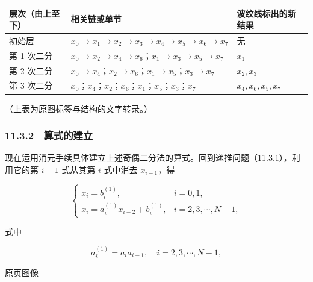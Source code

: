 \documentclass[
  10pt,
  fontset=fandol]{ctexart}
\newcounter{none} %
\begin{document}
{\def\LTcaptype{none} %
\begin{longtable}[]{@{}
  >{\raggedright\arraybackslash}p{}
  >{\raggedright\arraybackslash}p{}
  >{\raggedright\arraybackslash}p{}@{}}
\toprule\noalign{}
\begin{minipage}[b]{\linewidth}\raggedright
层次（由上至下）
\end{minipage} & \begin{minipage}[b]{\linewidth}\raggedright
相关链或单节
\end{minipage} & \begin{minipage}[b]{\linewidth}\raggedright
波纹线标出的新结果
\end{minipage} \\
\midrule\noalign{}
\endhead
\bottomrule\noalign{}
\endlastfoot
初始层 & \(x_0\to x_1\to x_2\to x_3\to x_4\to x_5\to x_6\to x_7\) & 无 \\
第 1 次二分 & \(x_0\to x_2\to x_4\to x_6\)；\(x_1\to x_3\to x_5\to x_7\) & \(x_1\) \\
第 2 次二分 & \(x_0\to x_4\)；\(x_2\to x_6\)；\(x_1\to x_5\)；\(x_3\to x_7\) & \(x_2,x_3\) \\
第 3 次二分 & \(x_0\)；\(x_4\)；\(x_2\)；\(x_6\)；\(x_1\)；\(x_5\)；\(x_3\)；\(x_7\) & \(x_4,x_6,x_5,x_7\) \\
\end{longtable}
}

（上表为原图标签与结构的文字转录。）

\subsubsection{11.3.2　算式的建立}\label{ux7b97ux5f0fux7684ux5efaux7acb}

现在运用消元手续具体建立上述奇偶二分法的算式。回到递推问题（11.3.1），利用它的第 \(i-1\) 式从其第 \(i\) 式中消去 \(x_{i-1}\)，得

\[
\begin{cases}
x_i=b_i^{(1)},& i=0,1,\\
x_i=a_i^{(1)}x_{i-2}+b_i^{(1)},& i=2,3,\cdots,N-1,
\end{cases}
\tag{11.3.4}
\]

式中

\[
a_i^{(1)}=a_i a_{i-1},\quad i=2,3,\cdots,N-1,
\tag{11.3.5}
\]

\href{../../source-images/pdf-287.jpeg}{原页图像}
\end{document}
